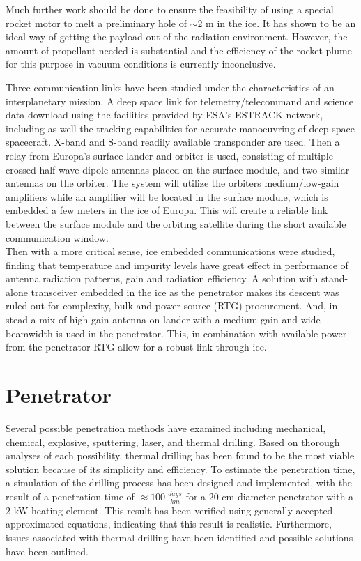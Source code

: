 Much further work should be done to ensure the feasibility of using a special rocket motor to melt a preliminary hole of $\sim$2 m in the ice. It has shown to be an ideal way of getting the payload out of the radiation environment. However, the amount of propellant needed is substantial and the efficiency of the rocket plume for this purpose in vacuum conditions is currently inconclusive.


Three communication links have been studied under the characteristics of an interplanetary mission. A deep space link for telemetry/telecommand and science data download using the facilities provided by ESA's ESTRACK network, including as well the tracking capabilities for accurate manoeuvring of deep-space spacecraft. X-band and S-band readily available transponder are used. Then a relay from Europa's surface lander and orbiter is used, consisting of multiple crossed half-wave dipole antennas placed on the surface module, and two similar antennas on the orbiter. The system will utilize the orbiters medium/low-gain amplifiers while an amplifier will be located in the surface module, which is embedded a few meters in the ice of Europa. This will create a reliable link between the surface module and the orbiting satellite during the short available communication window.
\\
Then with a more critical sense, ice embedded communications were studied, finding that temperature and impurity levels have great effect in performance of antenna radiation patterns, gain and radiation efficiency. A solution with stand-alone transceiver embedded in the ice as the penetrator makes its descent was ruled out for complexity, bulk and power source (RTG) procurement. And, in stead a mix of high-gain antenna on lander with a medium-gain and wide-beamwidth is used in the penetrator. This, in combination with available power from the penetrator RTG allow for a robust link through ice.
 



\section{Penetrator}
Several possible penetration methods have examined including mechanical, chemical, explosive, sputtering, laser, and thermal drilling. Based on thorough analyses of each possibility, thermal drilling has been found to be the most viable solution because of its simplicity and efficiency. To estimate the penetration time, a simulation of the drilling process has been designed and implemented, with the result of a penetration time of $\approx \SI{100}{\frac{days}{km}}$ for a 20 cm diameter penetrator with a 2 kW heating element. This result has been verified using generally accepted approximated equations, indicating that this result is realistic. Furthermore, issues associated with thermal drilling have been identified and possible solutions have been outlined.

